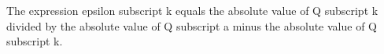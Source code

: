 The expression epsilon subscript k equals the absolute value of Q subscript k divided by the absolute value of Q subscript a minus the absolute value of Q subscript k.